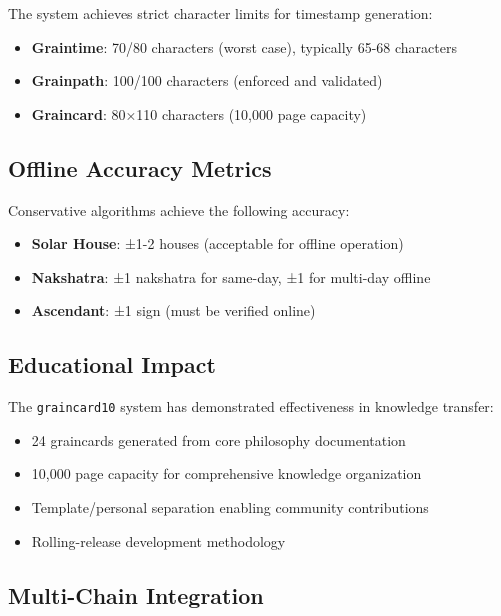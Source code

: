 \documentclass[11pt]{article}
\newcommand{\graincard}{\texttt{graincard10}}
\begin{document}
The system achieves strict character limits for timestamp generation:

\begin{itemize}
    \item \textbf{Graintime}: 70/80 characters (worst case), typically 65-68 characters
    \item \textbf{Grainpath}: 100/100 characters (enforced and validated)
    \item \textbf{Graincard}: 80×110 characters (10,000 page capacity)
\end{itemize}

\subsection{Offline Accuracy Metrics}

Conservative algorithms achieve the following accuracy:

\begin{itemize}
    \item \textbf{Solar House}: ±1-2 houses (acceptable for offline operation)
    \item \textbf{Nakshatra}: ±1 nakshatra for same-day, ±1 for multi-day offline
    \item \textbf{Ascendant}: ±1 sign (must be verified online)
\end{itemize}

\subsection{Educational Impact}

The \graincard{} system has demonstrated effectiveness in knowledge transfer:

\begin{itemize}
    \item 24 graincards generated from core philosophy documentation
    \item 10,000 page capacity for comprehensive knowledge organization
    \item Template/personal separation enabling community contributions
    \item Rolling-release development methodology
\end{itemize}

\subsection{Multi-Chain Integration}
\end{document}
